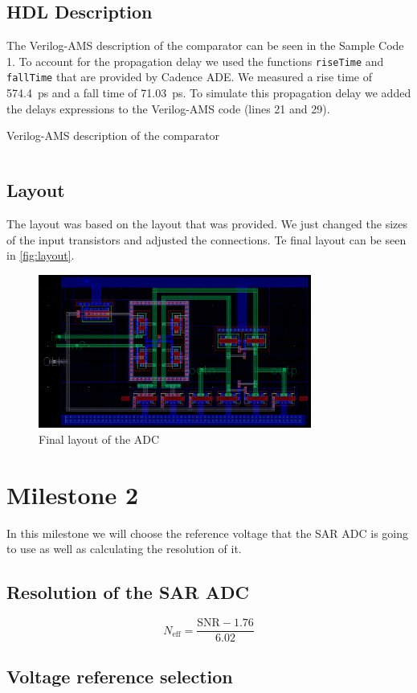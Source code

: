 \documentclass{article}
\newcommand*{\subb}[1]{\ensuremath{_{\mathrm{#1}}}}
\begin{document}
 \subsection{HDL Description}
 The Verilog-AMS description of the comparator can be seen in the Sample Code 1. To account for the propagation delay we used the functions \texttt{riseTime} and \texttt{fallTime} that are provided by Cadence ADE. We measured a rise time of \SI{574.4}{\ps} and a fall time of \SI{71.03}{\ps}. To simulate this propagation delay we added the delays expressions to the Verilog-AMS code (lines 21 and 29).
 \begin{listing}
  \caption{Verilog-AMS description of the comparator}
  \inputminted{verilog}{../milestone1/comparator/comp_v2/verilogams/verilog.vams}
 \end{listing}
 
 \subsection{Layout}
 The layout was based on the layout that was provided. We just changed the sizes of the input transistors and adjusted the connections. Te final layout can be seen in \autoref{fig:layout}.

 \begin{figure}[h]
  \centering
  \includegraphics[angle=90, width=0.8\textwidth]{img/layout}
  \caption{Final layout of the ADC}
  \label{fig:layout}
 \end{figure}
 \section*{Milestone 2}
 \setcounter{section}{2}
 \setcounter{subsection}{0}
 In this milestone we will choose the reference voltage that the SAR ADC is going to use as well as calculating the resolution of it.
 \subsection{Resolution of the SAR ADC}
 \begin{equation}
  N\subb{eff}=\frac{\mathrm{SNR}-1.76}{6.02}
 \end{equation}
 \subsection{Voltage reference selection}
\end{document}
